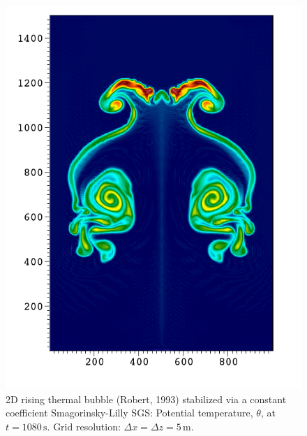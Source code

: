 \documentclass{report}
\begin{document}
\begin{figure}[htbp]
\includegraphics[width=\textwidth]{figures/RTB-Robert--smgo-5mX5m-1080s0000.png}
\caption{2D rising thermal bubble (Robert, 1993) stabilized via a constant coefficient Smagorinsky-Lilly SGS: Potential temperature, $\theta$, at $t=1080\,\mathrm{s}$. Grid resolution: $\Delta x = \Delta z = 5\,\mathrm{m}$.}
\label{fig:benchmarks/robert5msmago}
\end{figure}
\end{document}
